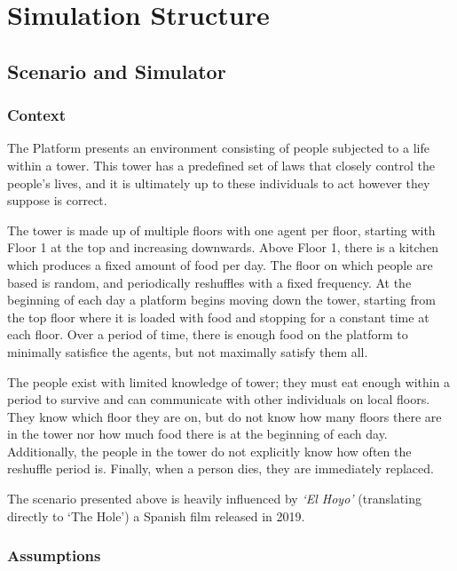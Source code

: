 \chapter{Simulation Structure}\label{simulation_structure}
\section{Scenario and Simulator}\label{scenario_and_simulator}

\subsection{Context}

The Platform presents an environment consisting of people subjected to a life within a tower. This tower has a predefined set of laws that closely control the people’s lives, and it is ultimately up to these individuals to act however they suppose is correct.
 
The tower is made up of multiple floors with one agent per floor, starting with Floor 1 at the top and increasing downwards. Above Floor 1, there is a kitchen which produces a fixed amount of food per day.
The floor on which people are based is random, and periodically reshuffles with a fixed frequency. At the beginning of each day a platform begins moving down the tower, starting from the top floor where it is loaded with food and stopping for a constant time at each floor. Over a period of time, there is enough food on the platform to minimally satisfice the agents, but not maximally satisfy them all.
 
The people exist with limited knowledge of tower; they must eat enough within a period to survive and can communicate with other individuals on local floors. They know which floor they are on, but do not know how many floors there are in the tower nor how much food there is at the beginning of each day. Additionally, the people in the tower do not explicitly know how often the reshuffle period is. Finally, when a person dies, they are immediately replaced.

The scenario presented above is heavily influenced by \textit{`El Hoyo'}\citep{elhoyo2019} (translating directly to `The Hole') a Spanish film released in 2019.

\subsection{Assumptions}


